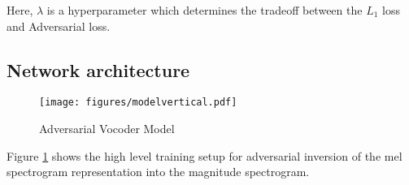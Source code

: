 \documentclass[a4paper]{article}
\begin{document}
Here, $\lambda$ is a hyperparameter which determines the tradeoff between the $L_1$ loss and Adversarial loss.


\subsection{Network architecture}

\begin{figure}[htbp]
    \centering
    \texttt{[image: figures/modelvertical.pdf]}
    \caption{Adversarial Vocoder Model}
    \label{fig:model}
\end{figure}

Figure \ref{fig:model} shows the high level training setup for adversarial inversion of the mel spectrogram representation into the magnitude spectrogram.
\end{document}
